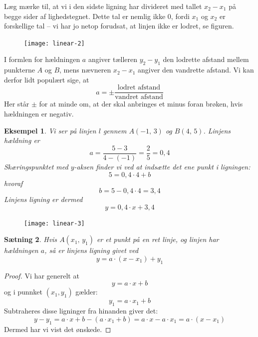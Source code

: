 \documentclass[12pt,oneside,a4paper]{article}
\newtheorem{thm}{Sætning}[section]
\newtheorem{eks}[thm]{Eksempel}
\begin{document}
Læg mærke til, at vi i den sidste ligning har divideret med tallet $x_2-x_1$ på
begge sider af lighedstegnet. Dette tal er nemlig ikke $0$, fordi $x_1$ og
$x_2$ er forskellige tal -- vi har jo netop forudsat, at linjen ikke er lodret, se
figuren.

\begin{figure}[ht]
    \centering
    \texttt{[image: linear-2]}
    \label{linear-2}
\end{figure}

I formlen for hældningen $a$ angiver tælleren $y_2-y_1$ den lodrette afstand
mellem punkterne $A$ og $B$, mens nævneren $x_2-x_1$ angiver den vandrette
afstand. Vi kan derfor lidt populært sige, at
$$
a = \pm \frac{\mbox{lodret afstand}}{\mbox{vandret afstand}}
$$
Her står $\pm$ for at minde om, at der skal anbringes et minus foran brøken,
hvis hældningen er negativ.
\begin{eks}
    Vi ser på linjen $l$ gennem $A(-1,\,3)$ og $B(4,\,5)$.
    Linjens hældning er
    $$
    a = \frac{5-3}{4-(-1)} = \frac{2}{5} = 0,4
    $$
    Skæringspunktet med $y$-aksen finder vi ved at indsætte det ene punkt i ligningen:
    $$
    5 = 0,4\cdot 4 + b
    $$
    hvoraf
    $$
    b = 5 - 0,4\cdot 4 = 3,4
    $$
    Linjens ligning er dermed
    $$
    y = 0,4 \cdot x + 3,4 
    $$
\end{eks}
\begin{figure}[ht]
    \centering
    \texttt{[image: linear-3]}
    \label{linear-3}
\end{figure}



\begin{thm}
    Hvis $A(x_1,\,y_1)$ er et punkt på en ret linje, og linjen har hældningen
    $a$, så er linjens ligning givet ved
    $$
    y = a\cdot (x-x_1) + y_1 
    $$
\end{thm}
\begin{proof}
    Vi har generelt at 
    $$
    y = a\cdot x + b
    $$
    og i punnket $(x_1, y_1)$ gælder:
    $$
    y_1 = a\cdot x_1 + b
    $$
    Subtraheres disse ligninger fra hinanden giver det:
    $$
    y-y_1 = a \cdot x + b - (a \cdot x_1 + b) = a \cdot x - a \cdot x_1 = a \cdot (x - x_1)
    $$
    Dermed har vi vist det ønskede.
\end{proof}
\end{document}
